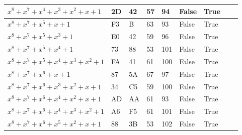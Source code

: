 \begin{footnotesize}
\begin{longtable}{|l|l|l|l|l|l|l|l|l|}
$x^8 + x^7 + x^4 + x^3 + x^2 + x + 1$   & 2D            & 42                & 57                  & 94                    & False               & True              &              &                                    \\ \hline
$x^8 + x^7 + x^5 + x + 1$               & F3            & B                 & 63                  & 93                    & False               & True              &              &                                    \\ \hline
$x^8 + x^7 + x^5 + x^3 + 1$             & E0            & 42                & 59                  & 96                    & False               & True              &              &                                    \\ \hline
$x^8 + x^7 + x^5 + x^4 + 1$             & 73            & 88                & 53                  & 101                   & False               & True              &              &                                    \\ \hline
$x^8 + x^7 + x^5 + x^4 + x^3 + x^2 + 1$ & FA            & 41                & 61                  & 100                   & False               & True              &              &                                    \\ \hline
$x^8 + x^7 + x^6 + x + 1$               & 87            & 5A                & 67                  & 97                    & False               & True              &              &                                    \\ \hline
$x^8 + x^7 + x^6 + x^3 + x^2 + x + 1$   & 34            & C5                & 59                  & 100                   & False               & True              &              &                                    \\ \hline
$x^8 + x^7 + x^6 + x^4 + x^2 + x + 1$   & AD            & AA                & 61                  & 93                    & False               & True              &              &                                    \\ \hline
$x^8 + x^7 + x^6 + x^4 + x^3 + x^2 + 1$ & A6            & F5                & 61                  & 101                   & False               & True              &              &                                    \\ \hline
$x^8 + x^7 + x^6 + x^5 + x^2 + x + 1$   & 88            & 3B                & 53                  & 102                   & False               & True              &              &                                    \\ \hline

\end{longtable}
\end{footnotesize}

